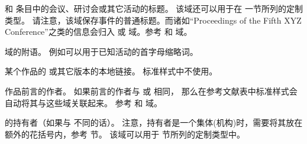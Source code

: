 \begin{fieldlist}

 和  条目中的会议、研讨会或其它活动的标题。
该域还可以用于在  一节所列的定制类型。
请注意，该域保存事件的普通标题。而诸如“Proceedings of the Fifth XYZ Conference”之类的信息会归入  或  域。参考  和  域。




 域的附语。
例如可以用于已知活动的首字母缩略词。




某个作品的  或其它版本的本地链接。
标准样式中不使用。




作品前言的作者。
如果前言的作者与  或  相同，
那么在参考文献表中标准样式会自动将其与这些域关联起来。
参考  和  域。




 的持有者（如果与  不同的话）。
注意，持有者是一个集体(机构)时，需要将其放在额外的花括号内，参考  节。
该域可以用于  节所列的定制类型中。


\end{fieldlist}
